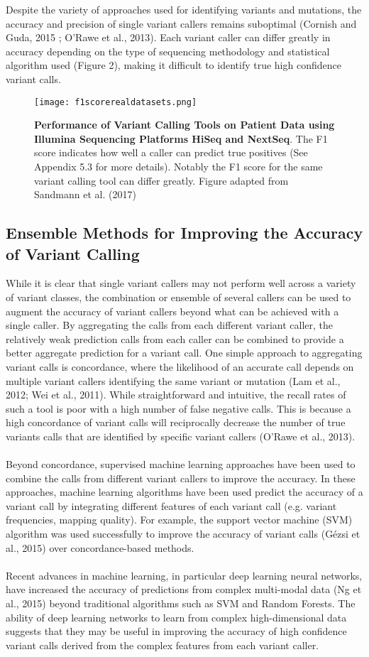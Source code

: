 \documentclass{article}
\begin{document}
Despite the variety of approaches used for identifying variants and mutations,  the accuracy and precision of single variant callers  remains suboptimal (Cornish and Guda, 2015 ; O'Rawe et al., 2013). Each variant caller can differ greatly in accuracy depending on the type of sequencing methodology and statistical algorithm used (Figure 2), making it difficult to identify true high confidence variant calls.
\begin{figure}[H]
\texttt{[image: f1scorerealdatasets.png]}
\centering
\caption{\textbf{Performance of Variant Calling Tools on Patient Data using Illumina Sequencing Platforms HiSeq and NextSeq}. The F1 score indicates how well a caller can predict true positives (See Appendix 5.3 for more details). Notably the F1 score for the same variant calling tool can differ greatly. Figure adapted from Sandmann et al. (2017)}
\end{figure}
\subsection{Ensemble Methods for Improving the Accuracy of Variant Calling} 
While it is clear that single variant callers may not perform well across a variety of variant classes, the combination or ensemble of several callers can be used to augment the accuracy of variant callers beyond what can be achieved with a single caller. By aggregating the calls from each different variant caller, the relatively weak prediction calls from each caller can be combined to provide a better aggregate prediction for a variant call. 
One simple approach to aggregating variant calls is concordance, where the likelihood of an accurate call depends on multiple variant callers identifying the same variant or mutation (Lam et al., 2012; Wei et al., 2011). While straightforward and intuitive, the recall rates of such a tool is poor with a high number of false negative calls. This is because a high concordance of variant calls will reciprocally decrease the number of true variants calls that are identified by specific variant callers (O'Rawe et al., 2013). \\\\ Beyond concordance, supervised machine learning approaches have been used to combine the calls from different variant callers to improve the accuracy. In these approaches, machine learning algorithms have been used predict the accuracy of a variant call by integrating different features of each variant call (e.g. variant frequencies, mapping quality). For example, the support vector machine (SVM) algorithm was used successfully to improve the accuracy of variant calls (Gézsi et al., 2015) over concordance-based methods. \\\\ Recent advances in machine learning, in particular deep learning neural networks, have increased the accuracy of predictions from complex multi-modal data (Ng et al., 2015) beyond traditional algorithms such as SVM and Random Forests. The ability of deep learning networks  to learn from complex high-dimensional data suggests that they may be useful in improving the accuracy of high confidence variant calls derived from the complex features from each variant caller. 
\end{document}
